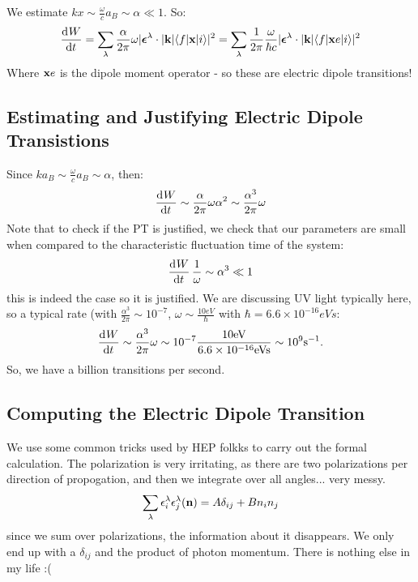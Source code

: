 We estimate $kx \sim \frac{\omega}{c}a_B \sim \alpha \ll 1$. So:
\begin{equation}
    \begin{split}
        \dod{W}{t} = \sum_\lambda \frac{\alpha}{2\pi}\omega \abs{\gv{\e}^\lambda \cdot \abs{\v{k}}\bra{f}\v{x}\ket{i}}^2 = \sum_\lambda \frac{1}{2\pi}\frac{\omega}{\hbar c}\abs{\gv{\e}^\lambda \cdot \abs{\v{k}}\bra{f}\v{x}e\ket{i}}^2
    \end{split}
\end{equation}
Where $\mathbf{x}e$ is the dipole moment operator - so these are electric dipole transitions!

\subsection{Estimating and Justifying Electric Dipole Transistions}
Since $ka_B \sim \frac{\omega}{c}a_B \sim \alpha$, then:
\begin{equation}
    \dod{W}{t} \sim \frac{\alpha}{2\pi}\omega \alpha^2 \sim \frac{\alpha^3}{2\pi}\omega
\end{equation}
Note that to check if the PT is justified, we check that our parameters are small when compared to the characteristic fluctuation time of the system:
\begin{equation}
    \dod{W}{t}\frac{1}{\omega} \sim \alpha^3 \ll 1
\end{equation}
this is indeed the case so it is justified. We are discussing UV light typically here, so a typical rate (with $\frac{\alpha^3}{2\pi} \sim 10^{-7}$, $\omega \sim \frac{10\si{eV}}{\hbar}$ with $\hbar = 6.6\times 10^{-16}\si{eVs}$:
\begin{equation}
    \dod{W}{t} \sim \frac{\alpha^3}{2\pi}\omega \sim 10^{-7}\frac{10\si{eV}}{ 6.6\times 10^{-16}\si{eVs}} \sim 10^9 \si{s^{-1}}.
\end{equation}
So, we have a billion transitions per second.

\subsection{Computing the Electric Dipole Transition}
We use some common tricks used by HEP folkks to carry out the formal calculation. The polarization is very irritating, as there are two polarizations per direction of propogation, and then we integrate over all angles... very messy. 
\begin{equation}
    \sum_\lambda \epsilon_i^\lambda \epsilon_j^\lambda(\mathbf{n}) = A\delta_{ij} + Bn_in_j
\end{equation}
since we sum over polarizations, the information about it disappears. We only end up with a $\delta_{ij}$ and the product of photon momentum. There is nothing else in my life :(

